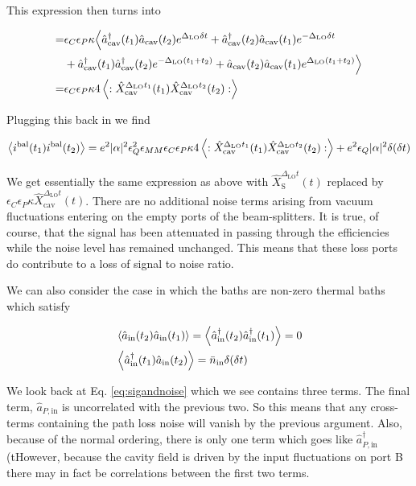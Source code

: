 \documentclass[12pt]{article}
\newcommand{\ep}{\epsilon}
\begin{document}
This expression then turns into

\begin{align}
=&\ep_C\ep_P\kappa\Big\langle\hat{a}^{\dag}_{\text{cav}}(t_1)\hat{a}_{\text{cav}}(t_2)e^{\Delta_{\text{LO}}\delta t} + \hat{a}^{\dag}_{\text{cav}}(t_2)\hat{a}_{\text{cav}}(t_1)e^{-\Delta_{\text{LO}}\delta t}\\
&+ \hat{a}^{\dag}_{\text{cav}}(t_1)\hat{a}^{\dag}_{\text{cav}}(t_2)e^{-\Delta_{\text{LO}}(t_1+t_2)} + \hat{a}_{\text{cav}}(t_2)\hat{a}_{\text{cav}}(t_1)e^{\Delta_{\text{LO}}(t_1+t_2)}\Big\rangle\\
=&\ep_C\ep_P\kappa 4\Braket{:\hat{X}_{\text{cav}}^{\Delta_{\text{LO}}t_1}(t_1) \hat{X}_{\text{cav}}^{\Delta_{\text{LO}}t_2}(t_2):}
\end{align}

Plugging this back in we find

\begin{align}
\Braket{i^{\text{bal}}(t_1)i^{\text{bal}}(t_2)} = e^2 |\alpha|^2 \ep_Q^2 \ep_{MM}\ep_C\ep_P\kappa 4\Braket{:\hat{X}_{\text{cav}}^{\Delta_{\text{LO}}t_1}(t_1)\hat{X}_{\text{cav}}^{\Delta_{\text{LO}}t_2}(t_2) :} + e^2 \ep_Q |\alpha|^2 \delta(\delta t)
\end{align}

We get essentially the same expression as above with $\hat{X}^{\Delta_{\text{LO}}t}_{\text{S}}(t)$ replaced by $\ep_C\ep_P\kappa\hat{X}^{\Delta_{\text{LO}}t}_{\text{cav}}(t)$. There are no additional noise terms arising from vacuum fluctuations entering on the empty ports of the beam-splitters. It is true, of course, that the signal has been attenuated in passing through the efficiencies while the noise level has remained unchanged. This means that these loss ports do contribute to a loss of signal to noise ratio.

We can also consider the case in which the baths are non-zero thermal baths which satisfy

\begin{align}
&\Braket{\hat{a}_{\text{in}}(t_2)\hat{a}_{\text{in}}(t_1)} = \Braket{\hat{a}^{\dag}_{\text{in}}(t_2)\hat{a}^{\dag}_{\text{in}}(t_1)} = 0\\ 
& \Braket{\hat{a}^{\dag}_{\text{in}}(t_1)\hat{a}_{\text{in}}(t_2)} = \bar{n}_{\text{in}} \delta(\delta t)
\end{align}

We look back at Eq. \ref{eq:sigandnoise} which we see contains three terms. The final term, $\hat{a}_{P,\text{in}}$ is uncorrelated with the previous two. So this means that any cross-terms containing the path loss noise will vanish by the previous argument. Also, because of the normal ordering, there is only one term which goes like $\hat{a}^{\dag}_{P,\text{in}}$(tHowever, because the cavity field is driven by the input fluctuations on port B there may in fact be correlations between the first two terms.
\end{document}
